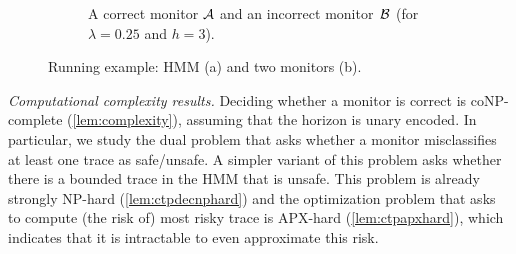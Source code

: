 \documentclass[runningheads]{llncs}
\newcommand{\icy}{{\color{cyan} icy}\xspace}
\newcommand{\dry}{{\color{brown} dry}\xspace}
\renewcommand{\paragraph}[1]{\smallskip\noindent\emph{#1}}
\begin{document}
\begin{figure}[t]
\begin{subfigure}{0.55\textwidth}
        \caption{A correct monitor $\mathcal{A}$ and an incorrect monitor~$\mathcal{B}$ (for $\lambda=0.25$ and $h=3$).
        }
        \label{fig:centralmon}
    \end{subfigure}
    \caption{Running example: HMM (a) and two monitors (b). }
    \label{fig:centralexample}
    \vspace{-.1cm}
\end{figure}



\paragraph{Computational complexity results.}
Deciding whether a monitor is correct is coNP-complete (\cref{lem:complexity}), assuming that the horizon is unary encoded.  In particular, we study the dual problem that asks whether a monitor misclassifies at least one trace as safe/unsafe.
A simpler variant of this problem asks whether there is a bounded trace in the HMM that is unsafe.
This problem is already strongly NP-hard (\cref{lem:ctpdecnphard}) and the optimization problem that asks to compute (the risk of) most risky trace is APX-hard (\cref{lem:ctpapxhard}), which indicates that it is intractable to even approximate this risk.
\end{document}
